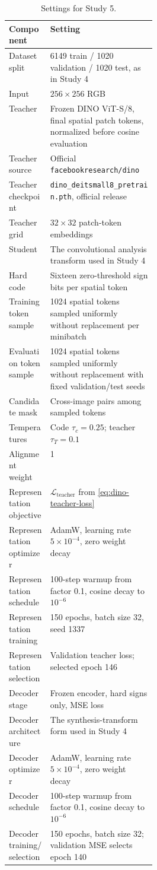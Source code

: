 \begin{table}[htbp]
\centering\small
\begin{tabularx}{\linewidth}{>{\raggedright\arraybackslash}p{0.29\linewidth}X}
\toprule
Component & Setting \\
\midrule
Dataset split & 6149 train / 1020 validation / 1020 test, as in Study 4 \\
Input & $256\times256$ RGB \\
Teacher & Frozen DINO ViT-S/8, final spatial patch tokens, normalized before cosine evaluation \\
Teacher source & Official \texttt{facebookresearch/dino} \\
Teacher checkpoint & \texttt{dino\_deitsmall8\_pretrain.pth}, official release \\
Teacher grid & $32\times32$ patch-token embeddings \\
Student & The convolutional analysis transform used in Study 4 \\
Hard code & Sixteen zero-threshold sign bits per spatial token \\
Training token sample & 1024 spatial tokens sampled uniformly without replacement per minibatch \\
Evaluation token sample & 1024 spatial tokens sampled uniformly without replacement with fixed validation/test seeds \\
Candidate mask & Cross-image pairs among sampled tokens \\
Temperatures & Code $\tau_c=0.25$; teacher $\tau_T=0.1$ \\
Alignment weight & 1 \\
Representation objective & $\mathcal L_{\mathrm{teacher}}$ from \cref{eq:dino-teacher-loss} \\
Representation optimizer & AdamW, learning rate $5\times10^{-4}$, zero weight decay \\
Representation schedule & 100-step warmup from factor 0.1, cosine decay to $10^{-6}$ \\
Representation training & 150 epochs, batch size 32, seed 1337 \\
Representation selection & Validation teacher loss; selected epoch 146 \\
Decoder stage & Frozen encoder, hard signs only, MSE loss \\
Decoder architecture & The synthesis-transform form used in Study 4 \\
Decoder optimizer & AdamW, learning rate $5\times10^{-4}$, zero weight decay \\
Decoder schedule & 100-step warmup from factor 0.1, cosine decay to $10^{-6}$ \\
Decoder training/selection & 150 epochs, batch size 32; validation MSE selects epoch 140 \\
\bottomrule
\end{tabularx}
\caption{Settings for Study 5.}
\label{tab:flowers102-teacher-settings}
\end{table}

